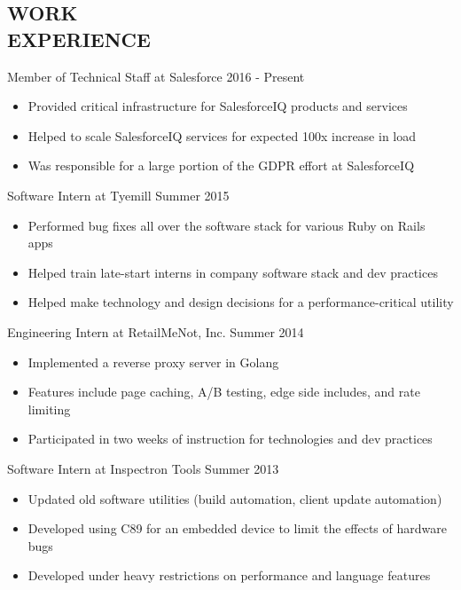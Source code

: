 \documentclass[line,margin]{res}
\begin{document}
\begin{resume}
\section{\textcolor{HeaderColor}{WORK \\ EXPERIENCE}} 

	      {\sc Member of Technical Staff at Salesforce} \hfill 2016 - Present
                 \begin{itemize}  \itemsep -2pt %
	      \item Provided critical infrastructure for SalesforceIQ products and services
                 \item Helped to scale SalesforceIQ services for expected 100x increase in load
                 \item Was responsible for a large portion of the GDPR effort at SalesforceIQ
                 \end{itemize}

                {\sc Software Intern at Tyemill} \hfill Summer 2015
                 \begin{itemize}  \itemsep -2pt %
                 \item Performed bug fixes all over the software stack for various Ruby on Rails apps
	      \item Helped train late-start interns in company software stack and dev practices
	      \item Helped make technology and design decisions for a performance-critical utility
                 \end{itemize}

                {\sc Engineering Intern at RetailMeNot, Inc.} \hfill Summer 2014
                 \begin{itemize}  \itemsep -2pt %
                 \item Implemented a reverse proxy server in Golang
                 \item Features include page caching, A/B testing, edge side includes, and rate limiting
                 \item Participated in two weeks of instruction for technologies and dev practices
                 \end{itemize}

                {\sc Software Intern at Inspectron Tools} \hfill Summer 2013
                 \begin{itemize}  \itemsep -2pt %
                 \item Updated old software utilities (build automation, client update automation)
                 \item Developed using C89 for an embedded device to limit the effects of hardware bugs
                 \item Developed under heavy restrictions on performance and language features
                 \end{itemize}
 

\end{resume}
\end{document}
